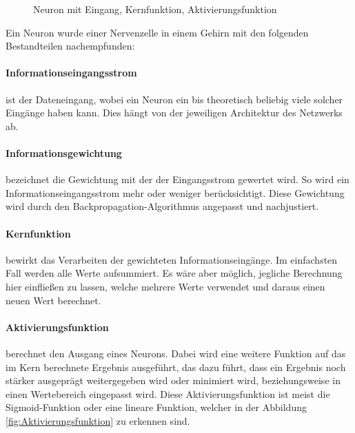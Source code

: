 \begin{figure}
\centering


	\caption{Neuron mit Eingang, Kernfunktion, Aktivierungsfunktion}
	\label{fig:Neuron}
\end{figure}

Ein Neuron wurde einer Nervenzelle in einem Gehirn mit den folgenden Bestandteilen nachempfunden:
\paragraph{Informationseingangsstrom} ist der Dateneingang, wobei ein Neuron ein bis theoretisch beliebig viele solcher Eingänge haben kann. 
Dies hängt von der jeweiligen Architektur des Netzwerks ab.

\paragraph{Informationsgewichtung} bezeichnet die Gewichtung mit der der Eingangsstrom gewertet wird. 
So wird ein Informationseingangsstrom mehr oder weniger berücksichtigt. 
Diese Gewichtung wird durch den Backpropagation-Algorithmus angepasst und nachjustiert.

\paragraph{Kernfunktion} bewirkt das Verarbeiten der gewichteten Informationseingänge. 
Im einfachsten Fall werden alle Werte aufsummiert. 
Es wäre aber möglich, jegliche Berechnung hier einfließen zu lassen, welche mehrere Werte verwendet und daraus einen neuen Wert berechnet.

\paragraph{Aktivierungsfunktion} berechnet den Ausgang eines Neurons. 
Dabei wird eine weitere Funktion auf das im Kern berechnete Ergebnis ausgeführt, das dazu führt, dass ein Ergebnis noch stärker ausgeprägt weitergegeben wird oder minimiert wird, beziehungsweise in einen Wertebereich eingepasst wird. 
Diese Aktivierungsfunktion ist meist die Sigmoid-Funktion oder eine lineare Funktion, welcher in der Abbildung \ref{fig:Aktivierungsfunktion} zu erkennen sind.

